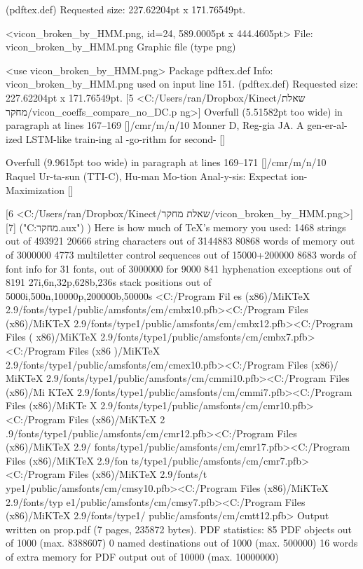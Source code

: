 (pdftex.def)             Requested size: 227.62204pt x 171.76549pt.

<vicon_broken_by_HMM.png, id=24, 589.0005pt x 444.4605pt>
File: vicon_broken_by_HMM.png Graphic file (type png)

<use vicon_broken_by_HMM.png>
Package pdftex.def Info: vicon_broken_by_HMM.png used on input line 151.
(pdftex.def)             Requested size: 227.62204pt x 171.76549pt.
 [5 <C:/Users/ran/Dropbox/Kinect/שאלת מחקר/vicon_coeffs_compare_no_DC.p
ng>]
Overfull \hbox (5.51582pt too wide) in paragraph at lines 167--169
[]/cmr/m/n/10 Monner D, Reg-gia JA. A gen-er-al-ized LSTM-like train-ing al
-go-rithm for second-
 []


Overfull \hbox (9.9615pt too wide) in paragraph at lines 169--171
[]/cmr/m/n/10 Raquel Ur-ta-sun (TTI-C), Hu-man Mo-tion Anal-y-sis: Expectat
ion-Maximization
 []

[6 <C:/Users/ran/Dropbox/Kinect/שאלת מחקר/vicon_broken_by_HMM.png>]
[7] ("C:\Users\ran\Dropbox\Kinect{} מחקר\prop.aux") ) 
Here is how much of TeX's memory you used:
 1468 strings out of 493921
 20666 string characters out of 3144883
 80868 words of memory out of 3000000
 4773 multiletter control sequences out of 15000+200000
 8683 words of font info for 31 fonts, out of 3000000 for 9000
 841 hyphenation exceptions out of 8191
 27i,6n,32p,628b,236s stack positions out of 5000i,500n,10000p,200000b,50000s
<C:/Program Fil
es (x86)/MiKTeX 2.9/fonts/type1/public/amsfonts/cm/cmbx10.pfb><C:/Program Files
 (x86)/MiKTeX 2.9/fonts/type1/public/amsfonts/cm/cmbx12.pfb><C:/Program Files (
x86)/MiKTeX 2.9/fonts/type1/public/amsfonts/cm/cmbx7.pfb><C:/Program Files (x86
)/MiKTeX 2.9/fonts/type1/public/amsfonts/cm/cmex10.pfb><C:/Program Files (x86)/
MiKTeX 2.9/fonts/type1/public/amsfonts/cm/cmmi10.pfb><C:/Program Files (x86)/Mi
KTeX 2.9/fonts/type1/public/amsfonts/cm/cmmi7.pfb><C:/Program Files (x86)/MiKTe
X 2.9/fonts/type1/public/amsfonts/cm/cmr10.pfb><C:/Program Files (x86)/MiKTeX 2
.9/fonts/type1/public/amsfonts/cm/cmr12.pfb><C:/Program Files (x86)/MiKTeX 2.9/
fonts/type1/public/amsfonts/cm/cmr17.pfb><C:/Program Files (x86)/MiKTeX 2.9/fon
ts/type1/public/amsfonts/cm/cmr7.pfb><C:/Program Files (x86)/MiKTeX 2.9/fonts/t
ype1/public/amsfonts/cm/cmsy10.pfb><C:/Program Files (x86)/MiKTeX 2.9/fonts/typ
e1/public/amsfonts/cm/cmsy7.pfb><C:/Program Files (x86)/MiKTeX 2.9/fonts/type1/
public/amsfonts/cm/cmtt12.pfb>
Output written on prop.pdf (7 pages, 235872 bytes).
PDF statistics:
 85 PDF objects out of 1000 (max. 8388607)
 0 named destinations out of 1000 (max. 500000)
 16 words of extra memory for PDF output out of 10000 (max. 10000000)

